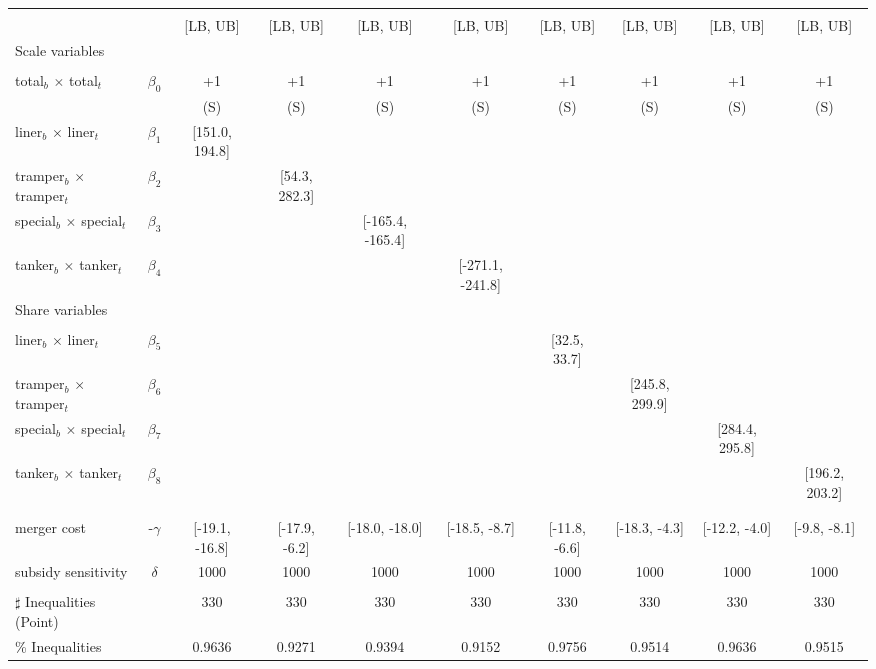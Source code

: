 \begin{tabular}{@{\extracolsep{5pt}}lccccccccc}
\toprule 
 &  &  &  &  &  &  &  &  &  \\
 &  & [LB, UB] & [LB, UB] & [LB, UB] & [LB, UB] & [LB, UB] & [LB, UB] & [LB, UB] & [LB, UB] \\
\midrule 
Scale variables &  &  &  &  &  &  &  \\
 &  &  &  &  &  &  &  &  \\
total$_{b}$ $\times$ total$_{t}$ & $\beta_0$ & +1 & +1 & +1 & +1 & +1 & +1 & +1 & +1 \\
 &  & (S) & (S) & (S) & (S) & (S) & (S) & (S) & (S) \\
liner$_{b}$ $\times$ liner$_{t}$ & $\beta_1$ & [151.0, 194.8] &  &  &  &  &  &  &  \\
tramper$_{b}$ $\times$ tramper$_{t}$ & $\beta_2$ &  & [54.3, 282.3] &  &  &  &  &  &  \\
special$_{b}$ $\times$ special$_{t}$ & $\beta_3$ &  &  & [-165.4, -165.4] &  &  &  &  &  \\
tanker$_{b}$ $\times$ tanker$_{t}$ & $\beta_4$ &  &  &  & [-271.1, -241.8] &  &  &  &  \\
Share variables &  &  &  &  &  &  &  &  &  \\
 &  &  &  &  &  &  &  &  &  \\
liner$_{b}$ $\times$ liner$_{t}$ & $\beta_5$ &  &  &  &  & [32.5, 33.7] &  &  &  \\
tramper$_{b}$ $\times$ tramper$_{t}$ & $\beta_6$ &  &  &  &  &  & [245.8, 299.9] &  &  \\
special$_{b}$ $\times$ special$_{t}$ & $\beta_7$ &  &  &  &  &  &  & [284.4, 295.8] &  \\
tanker$_{b}$ $\times$ tanker$_{t}$ & $\beta_8$ &  &  &  &  &  &  &  & [196.2, 203.2] \\
 &  &  &  &  &  &  &  &  &  \\
 &  &  &  &  &  &  &  &  &  \\
merger cost & -$\gamma$ & [-19.1, -16.8] & [-17.9, -6.2] & [-18.0, -18.0] & [-18.5, -8.7] & [-11.8, -6.6] & [-18.3, -4.3] & [-12.2, -4.0] & [-9.8, -8.1] \\
subsidy sensitivity & $\delta$ & 1000 & 1000 & 1000 & 1000 & 1000 & 1000 & 1000 & 1000 \\
 &  &  &  &  &  &  &  &  &  \\
\hline 
$\sharp$ Inequalities (Point) &  & 330 & 330 & 330 & 330 & 330 & 330 & 330 & 330 \\
\% Inequalities &  & 0.9636 & 0.9271 & 0.9394 & 0.9152 & 0.9756 & 0.9514 & 0.9636 & 0.9515 \\
\bottomrule 
\end{tabular}
